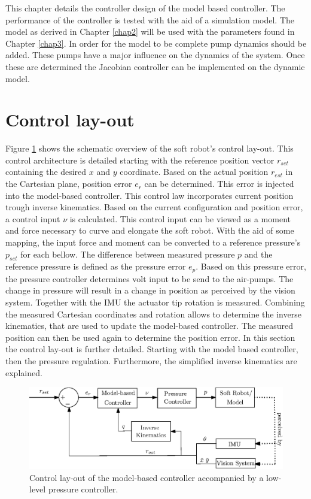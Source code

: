 \label{chap4}

This chapter details the controller design of the model based controller. The performance of the controller is tested with the aid of a simulation model. The model as derived in Chapter \ref{chap2} will be used with the parameters found in Chapter \ref{chap3}. In order for the model to be complete pump dynamics should be added. These pumps have a major influence on the dynamics of the system. Once these are determined the Jacobian controller can be implemented on the dynamic model. 



\section{Control lay-out}

Figure \ref{fig4:controllayout} shows the schematic overview of the soft robot's control lay-out. This control architecture is detailed starting with the reference position vector $r_{set}$ containing the desired $x$ and $y$ coordinate. Based on the actual position $r_{est}$ in the Cartesian plane, position error $e_r$ can be determined. This error is injected into the model-based controller. This control law incorporates current position trough inverse kinematics. Based on the current configuration and position error, a control input $\nu$ is calculated. This control input can be viewed as a moment and force necessary to curve and elongate the soft robot. With the aid of some mapping, the input force and moment can be converted to a reference pressure's $p_{set}$ for each bellow. The difference between measured pressure $p$ and the reference pressure is defined as the pressure error $e_p$. Based on this pressure error, the pressure controller determines volt input to be send to the air-pumps. The change in pressure will result in a change in position as perceived by the vision system. Together with the IMU the actuator tip rotation is measured. Combining the measured Cartesian coordinates and rotation allows to determine the inverse kinematics, that are used to update the model-based controller. The measured position can then be used again to determine the position error. In this section the control lay-out is further detailed. Starting with the model based controller, then the pressure regulation. Furthermore, the simplified inverse kinematics are explained.  


\begin{figure}[H]
    \centering
    \includegraphics[width = \textwidth]{Figures/Chapter3/controlschemeActual.eps}
    \caption{Control lay-out of the model-based controller accompanied by a low-level pressure controller.}
    \label{fig4:controllayout}
\end{figure}




